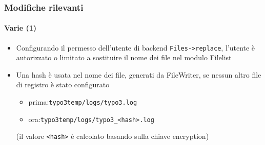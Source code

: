
\begin{frame}[fragile]
	\frametitle{Modifiche rilevanti}
	\framesubtitle{Varie (1)}

	\lstset{basicstyle=\tiny\ttfamily}

	\begin{itemize}

		\item Configurando il permesso dell'utente di backend \texttt{Files->replace}, l'utente è
			autorizzato o limitato a sostituire il nome dei file nel modulo Filelist


		\item Una hash è usata nel nome dei file, generati da FileWriter,
			se nessun altro file di registro è stato configurato

			\begin{itemize}
				\item prima:\tabto{1.2cm}\texttt{typo3temp/logs/typo3.log}
				\item ora:\tabto{1.2cm}\texttt{typo3temp/logs/typo3\_<hash>.log}
			\end{itemize}

			\small(il valore \texttt{<hash>} è calcolato basando sulla chiave encryption)\normalsize


	\end{itemize}

\end{frame}



